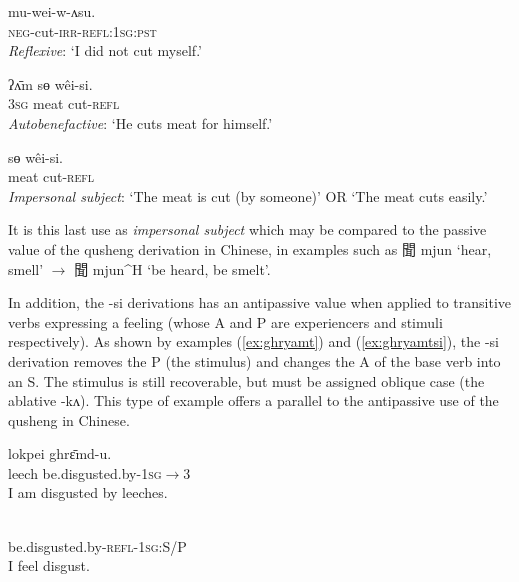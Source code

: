 \documentclass[oldfontcommands,oneside,a4paper,11pt]{article}
\newcommand{\ipa}[1]{{\phon \mbox{#1}}} %
\newcommand{\zh}[1]{{\cn #1}}
\newcommand{\ch}[3]{\zh{#1} \ipa{#2} `#3'}
\begin{document}
\begin{exe}
\ex \label{ex:weiwasu} 
\gll 
	\ipa{mu-wei-w-ʌsu.}  \\
\textsc{neg}-cut-\textsc{irr}-\textsc{refl:1sg:pst} \\
\glt \textit{Reflexive}: `I did not cut myself.'
\end{exe}  

\begin{exe}
\ex \label{ex:weisi2} 
\gll 
 \ipa{ʔʌ̄m} \ipa{sɵ}  	\ipa{wêi-si.}  \\
\textsc{3sg} meat cut-\textsc{refl} \\
\glt \textit{Autobenefactive}: `He cuts meat for himself.'
\end{exe}
 
\begin{exe}
\ex \label{ex:weisi} 
\gll 
 \ipa{sɵ}  	\ipa{wêi-si.}  \\
 meat cut-\textsc{refl} \\
\glt \textit{Impersonal subject}: `The meat is cut (by someone)' OR `The meat cuts easily.'
\end{exe}

It is this last use as \textit{impersonal subject} which may be compared to the passive value of the qusheng derivation in Chinese, in examples such as \ch{聞}{mjun}{hear, smell} $\rightarrow$ \ch{聞}{mjun^H}{be heard, be smelt}.

In addition, the \ipa{-si} derivations has an antipassive value when applied to transitive verbs expressing a feeling (whose A and P are experiencers and stimuli respectively). As shown by examples (\ref{ex:ghryamt})  and (\ref{ex:ghryamtsi}), the \ipa{-si} derivation removes the P (the stimulus) and changes the A of the base verb into an S. The stimulus is still recoverable, but must be assigned oblique case (the ablative \ipa{-kʌ}). This type of example offers a parallel to the antipassive use of the qusheng in Chinese.

\begin{exe}
\ex \label{ex:ghryamt} 
\gll 
  	\ipa{lokpei}  	\ipa{ghrɛ̄md-u.}  \\
leech  be.disgusted.by-\textsc{1sg$\rightarrow$3} \\
 \glt  I am disgusted by leeches.
\end{exe}

\begin{exe}
\ex \label{ex:ghryamtsi} 
\gll \ipa{gʰrɛ̄m-si-ŋʌ}\\
 be.disgusted.by-\textsc{refl-1sg:S/P} \\
\glt  I feel disgust.
\end{exe}
\end{document}
